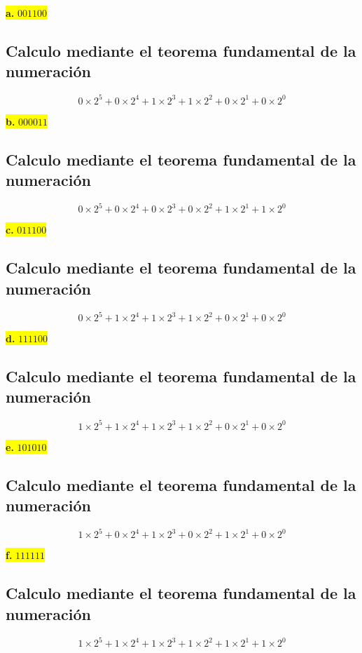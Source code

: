\documentclass[a4paper,12pt]{article}
\begin{document}
	\begin{center}
	\colorbox{yellow}{{\textbf{a.} $001100$}}
	\subsection*{Calculo mediante el teorema fundamental de la numeración}
	\[
	0\times2^{5} + 0\times2^{4} + 1\times2^{3} + 1\times2^{2} + 0\times2^{1} + 0\times2^{0}
	\]
	\end{center}
	\begin{center}
		\colorbox{yellow}{{\textbf{b.} $000011$}}
		\subsection*{Calculo mediante el teorema fundamental de la numeración}
		\[
		0\times2^{5} + 0\times2^{4} + 0\times2^{3} + 0\times2^{2} + 1\times2^{1} + 1\times2^{0}
		\]
	\end{center}
	\begin{center}
		\colorbox{yellow}{{\textbf{c.} $011100$}}
		\subsection*{Calculo mediante el teorema fundamental de la numeración}
		\[
		0\times2^{5} + 1\times2^{4} + 1\times2^{3} + 1\times2^{2} + 0\times2^{1} + 0\times2^{0}
		\]
	\end{center}
	\begin{center}
		\colorbox{yellow}{{\textbf{d.} $111100$}}
		\subsection*{Calculo mediante el teorema fundamental de la numeración}
		\[
		1\times2^{5} + 1\times2^{4} + 1\times2^{3} + 1\times2^{2} + 0\times2^{1} + 0\times2^{0}
		\]
	\end{center}
	\begin{center}
		\colorbox{yellow}{{\textbf{e.} $101010$}}
		\subsection*{Calculo mediante el teorema fundamental de la numeración}
		\[
		1\times2^{5} + 0\times2^{4} + 1\times2^{3} + 0\times2^{2} + 1\times2^{1} + 0\times2^{0}
		\]
	\end{center}
	\begin{center}
		\colorbox{yellow}{{\textbf{f.} $111111$}}
		\subsection*{Calculo mediante el teorema fundamental de la numeración}
		\[
		1\times2^{5} + 1\times2^{4} + 1\times2^{3} + 1\times2^{2} + 1\times2^{1} + 1\times2^{0}
		\]
	\end{center}
\end{document}
